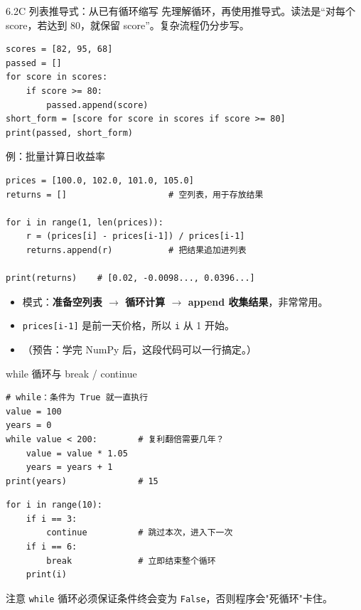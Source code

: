 \documentclass[9pt]{ctexbeamer}
\begin{document}
\begin{frame}[fragile]{6.2C 列表推导式：从已有循环缩写}
\small 先理解循环，再使用推导式。读法是“对每个 score，若达到 80，就保留 score”。复杂流程仍分步写。
\medskip
\begin{lstlisting}
scores = [82, 95, 68]
passed = []
for score in scores:
    if score >= 80:
        passed.append(score)
short_form = [score for score in scores if score >= 80]
print(passed, short_form)
\end{lstlisting}
\end{frame}

\begin{frame}[fragile]{例：批量计算日收益率}
	\begin{lstlisting}
prices = [100.0, 102.0, 101.0, 105.0]
returns = []                    # 空列表，用于存放结果

for i in range(1, len(prices)):
    r = (prices[i] - prices[i-1]) / prices[i-1]
    returns.append(r)           # 把结果追加进列表

print(returns)    # [0.02, -0.0098..., 0.0396...]
\end{lstlisting}
	\begin{itemize}
		\item 模式：\textbf{准备空列表 $\to$ 循环计算 $\to$ append 收集结果}，非常常用。
		\item \texttt{prices[i-1]} 是前一天价格，所以 \texttt{i} 从 1 开始。
		\item （预告：学完 NumPy 后，这段代码可以一行搞定。）
	\end{itemize}
\end{frame}

\begin{frame}[fragile]{while 循环与 break / continue}
	\begin{lstlisting}
# while：条件为 True 就一直执行
value = 100
years = 0
while value < 200:        # 复利翻倍需要几年？
    value = value * 1.05
    years = years + 1
print(years)              # 15
\end{lstlisting}
	\begin{lstlisting}
for i in range(10):
    if i == 3:
        continue          # 跳过本次，进入下一次
    if i == 6:
        break             # 立即结束整个循环
    print(i)
\end{lstlisting}
	\begin{alertblock}{注意}
		\texttt{while} 循环必须保证条件终会变为 \texttt{False}，否则程序会"死循环"卡住。
	\end{alertblock}
\end{frame}
\end{document}
